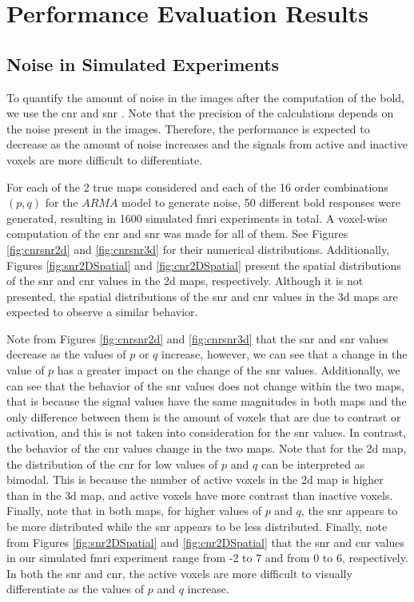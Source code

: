 \chapter{Performance Evaluation Results}

\section{Noise in Simulated Experiments}

To quantify the amount of noise in the images after the computation of the \gls{bold}, we use the
\gls{cnr} and \gls{snr} \cite{welvaert2013definition}. Note that the precision of the calculations 
depends on the noise present in the images. Therefore, the performance is expected to decrease as the 
amount of noise increases and the signals from active and inactive voxels are more difficult to 
differentiate.

For each of the 2 true maps considered and each of the 16 order combinations $(p,q)$ for the 
$ARMA$ model to generate noise, 50 different \gls{bold} responses were generated, resulting in 
1600 simulated \gls{fmri} experiments in total. A voxel-wise computation of the \gls{cnr} and 
\gls{snr} was made for all of them. See Figures \ref{fig:cnrsnr2d} and \ref{fig:cnrsnr3d} for their numerical 
distributions. Additionally, Figures \ref{fig:snr2DSpatial} and \ref{fig:cnr2DSpatial} present the spatial 
distributions of the \gls{snr} and \gls{cnr} values in the \gls{2d} maps, respectively. Although it is not 
presented, the spatial distributions of the \gls{snr} and \gls{cnr} values in the \gls{3d} maps are 
expected to observe a similar behavior.

Note from Figures \ref{fig:cnrsnr2d} and \ref{fig:cnrsnr3d} that the \gls{snr} and \gls{snr} values 
decrease as the values of $p$ or $q$ increase, however, we can see that a change in the value of $p$ has 
a greater impact on the change of the \gls{snr} values. Additionally, we can see that the behavior of the 
\gls{snr} values does not change within the two maps, that is because the signal values have the same 
magnitudes in both maps and the only difference between them is the amount of voxels that are due to 
contrast or activation, and this is not taken into consideration for the \gls{snr} values. In contrast, the 
behavior of the \gls{cnr} values change in the two maps. Note that for the \gls{2d} map, the distribution 
of the \gls{cnr} for low values of $p$ and $q$ can be interpreted as bimodal. This is because the 
number of active voxels in the \gls{2d} map is higher than in the \gls{3d} map, and 
active voxels have more contrast than inactive voxels. Finally, note that in both maps, 
for higher values of $p$ and $q$, the \gls{snr} appears to be more distributed 
while the \gls{snr} appears to be less distributed. Finally, note from Figures \ref{fig:snr2DSpatial} 
and \ref{fig:cnr2DSpatial} that the \gls{snr} and \gls{cnr} values in our simulated 
\gls{fmri} experiment range from -2 to 7 and from 0 to 6, respectively. In both the 
\gls{snr} and \gls{cnr}, the active voxels are more difficult to visually differentiate as the values 
of $p$ and $q$ increase.

